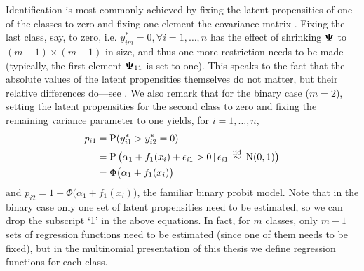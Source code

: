 \begin{remark}
  Identification is most commonly achieved by fixing the latent propensities of one of the classes to zero and fixing one element the covariance matrix \citep{dansie1985parameter,bunch1991estimability}.
  Fixing the last class, say, to zero, i.e. $y_{im}^* = 0,\forall i=1,\dots,n$ has the effect of shrinking ${\bm\Psi}$ to $(m-1)\times(m-1)$ in size, and thus one more restriction needs to be made (typically, the first element ${\bm\Psi}_{11}$ is set to one).
  This speaks to the fact that the absolute values of the latent propensities themselves do not matter, but their relative differences do---see .   
  We also remark that for the binary case ($m=2$), setting the latent propensities for the second class to zero and fixing the remaining variance parameter to one yields, for $i=1,\dots,n$,
  \begin{align}
    p_{i1} 
    &= \operatorname{P}(y_{i1}^* > y_{i2}^* = 0) \nonumber \\
    &= \operatorname{P}\big(\alpha_1 + f_1(x_i) + \epsilon_{i1} > 0 \,|\, \epsilon_{i1} \,\overset{\text{iid}}{\sim}\, \operatorname{N}(0,1) \big) \nonumber \\
    &= \Phi\big( \alpha_1 + f_1(x_i) \big) \label{eq:iprobitbin}
  \end{align}
  and $p_{i2} = 1 - \Phi\big( \alpha_1 + f_1(x_i) \big)$, the familiar binary probit model.
  Note that in the binary case only one set of latent propensities need to be estimated, so we can drop the subscript `1' in the above equations.
  In fact, for $m$ classes, only $m-1$ sets of regression functions need to be estimated (since one of them needs to be fixed), but in the multinomial presentation of this thesis we define regression functions for each class.
\end{remark}



